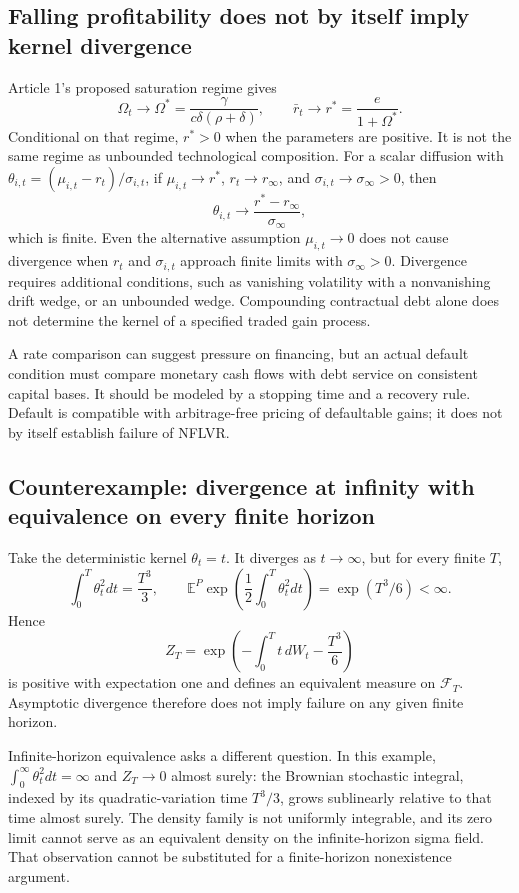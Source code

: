 \documentclass[11pt,letterpaper]{report}
\begin{document}
\subsection{Falling profitability does not by itself imply kernel divergence}
Article 1's proposed saturation regime gives
\[
 \Omega_t\longrightarrow\Omega^*
       =\frac{\gamma}{c\delta(\rho+\delta)},\qquad
 \bar r_t\longrightarrow r^*=\frac{e}{1+\Omega^*}.
\]
Conditional on that regime, $r^*>0$ when the parameters are positive.
It is not the same regime as unbounded technological composition.
For a scalar diffusion with
$\theta_{i,t}=(\mu_{i,t}-r_t)/\sigma_{i,t}$, if
$\mu_{i,t}\to r^*$, $r_t\to r_\infty$, and
$\sigma_{i,t}\to\sigma_\infty>0$, then
\[
 \theta_{i,t}\longrightarrow
           \frac{r^*-r_\infty}{\sigma_\infty},
\]
which is finite. Even the alternative assumption $\mu_{i,t}\to0$
does not cause divergence when $r_t$ and $\sigma_{i,t}$ approach
finite limits with $\sigma_\infty>0$. Divergence requires additional
conditions, such as vanishing volatility with a nonvanishing drift
wedge, or an unbounded wedge. Compounding contractual debt alone
does not determine the kernel of a specified traded gain process.

A rate comparison can suggest pressure on financing, but an actual
default condition must compare monetary cash flows with debt service
on consistent capital bases. It should be modeled by a stopping time
and a recovery rule. Default is compatible with arbitrage-free pricing
of defaultable gains; it does not by itself establish failure of NFLVR.

\subsection{Counterexample: divergence at infinity with equivalence on every finite horizon}
Take the deterministic kernel $\theta_t=t$. It diverges as
$t\to\infty$, but for every finite $T$,
\[
 \int_0^T\theta_t^2dt=\frac{T^3}{3},\qquad
 \mathbb E^P\exp\left(\frac12\int_0^T\theta_t^2dt\right)
       =\exp(T^3/6)<\infty.
\]
Hence
\[
 Z_T=\exp\left(-\int_0^Tt\,dW_t-\frac{T^3}{6}\right)
\]
is positive with expectation one and defines an equivalent measure
on $\mathcal F_T$. Asymptotic divergence therefore does not imply
failure on any given finite horizon.

Infinite-horizon equivalence asks a different question. In this
example, $\int_0^\infty\theta_t^2dt=\infty$ and $Z_T\to0$
almost surely: the Brownian stochastic integral, indexed by its
quadratic-variation time $T^3/3$, grows sublinearly relative to that
time almost surely. The density family is not uniformly integrable,
and its zero limit cannot serve as an equivalent density on the
infinite-horizon sigma field. That observation cannot be substituted
for a finite-horizon nonexistence argument.
\end{document}
